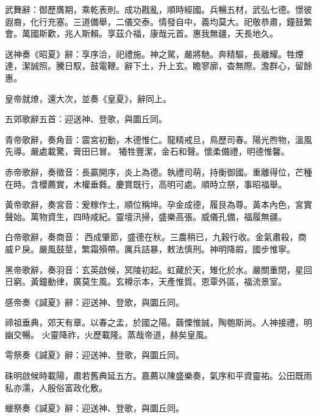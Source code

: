 \begin{pinyinscope}
 武舞辭：御歷膺期，乘乾表則。成功戡亂，順時經國。兵暢五材，武弘七德。憬彼遐裔，化行充塞。三道備舉，二儀交泰。情發自中，義均莫大。祀敬恭肅，鐘鼓繁會。萬國斯歡，兆人斯賴。享茲介福，康哉元首。惠我無疆，天長地久。



 送神奏《昭夏》辭：享序洽，祀禮施。神之駕，嚴將馳。奔精驅，長離耀。牲煙達，潔誠照。騰日馭，鼓電鞭。辭下土，升上玄。瞻寥廓，杳無際。澹群心，留餘惠。



 皇帝就燎，還大次，並奏《皇夏》，辭同上。



 五郊歌辭五首：迎送神、登歌，與圜丘同。



 青帝歌辭，奏角音：震宮初動，木德惟仁。龍精戒旦，鳥歷司春。陽光煦物，溫風先導。嚴處載驚，膏田已冒。
 犧牲豐潔，金石和聲。懷柔備禮，明德惟馨。



 赤帝歌辭，奏徵音：長贏開序，炎上為德。執禮司萌，持衡御國。重離得位，芒種在時。含櫻薦實，木權垂蕤。慶賞既行，高明可處。順時立祭，事昭福舉。



 黃帝歌辭，奏宮音：爰稼作土，順位稱坤。孕金成德，履艮為尊。黃本內色，宮實聲始。萬物資生，四時咸紀。靈壇汛掃，盛樂高張。威儀孔備，福履無疆。



 白帝歌辭，奏商音：
 西成肇節，盛德在秋。三農稍已，九穀行收。金氣肅殺，商威Ｐ戾。嚴風鼓莖，繁霜殞帶。厲兵詰暴，敕法慎刑。神明降嘏，國步惟寧。



 黑帝歌辭，奏羽音：玄英啟候，冥陵初起。虹藏於天，雉化於水。嚴關重閉，星回日窮。黃鐘動律，廣莫生風。玄樽示本，天產惟質。恩覃外區，福流景室。



 感帝奏《諴夏》辭：迎送神、登歌，與圜丘同。



 禘祖垂典，郊天有章。以春之孟，於國之陽。繭慄惟誠，陶匏斯尚。人神接禮，明幽交暢。
 火靈降祚，火歷載隆。蒸哉帝道，赫矣皇風。



 雩祭奏《諴夏》辭：迎送神、登歌，與圜丘同。



 硃明啟候時載陽，肅若舊典延五方。嘉薦以陳盛樂奏，氣序和平資靈祐。公田既雨私亦濡，人殷俗富政化敷。



 蠟祭奏《諴夏》辭：迎送神、登歌，與圜丘同。




\end{pinyinscope}
